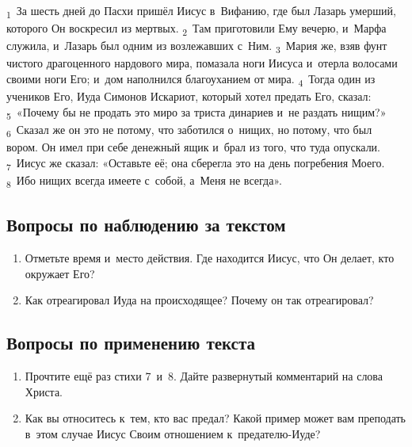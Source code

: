 \documentclass[a4paper,12pt]{article}
\begin{document}
\textsubscript{1}~За шесть дней до Пасхи пришёл Иисус в~Вифанию, где был Лазарь умерший, которого Он воскресил из мертвых. \textsubscript{2}~Там приготовили Ему вечерю, и~Марфа служила, и~Лазарь был одним из возлежавших с~Ним. \textsubscript{3}~Мария же, взяв фунт чистого драгоценного нардового мира, помазала ноги Иисуса и~отерла волосами своими ноги Его; и~дом наполнился благоуханием от мира. \textsubscript{4}~Тогда один из учеников Его, Иуда Симонов Искариот, который хотел предать Его, сказал: \textsubscript{5}~«Почему бы не продать это миро за триста динариев и~не раздать нищим?» \textsubscript{6}~Сказал же он это не потому, что заботился о~нищих, но потому, что был вором. Он имел при себе денежный ящик и~брал из того, что туда опускали. \textsubscript{7}~Иисус же сказал: «Оставьте её; она сберегла это на день погребения Моего. \textsubscript{8}~Ибо нищих всегда имеете с~собой, а~Меня не всегда».

\subsection*{Вопросы по наблюдению за текстом}
\begin{enumerate}
    \item Отметьте время и~место действия. Где находится Иисус, что Он делает, кто окружает Его? 
    
    \myline
    
    \myline
    \item Как отреагировал Иуда на происходящее? Почему он так отреагировал? 
    
    \myline
    
    \myline
\end{enumerate}

\subsection*{Вопросы по применению текста} 
\begin{enumerate}
    \item Прочтите ещё раз стихи 7~и~8. Дайте развернутый комментарий на слова Христа. 
    
    \myline
    
    \myline
    \item Как вы относитесь к~тем, кто вас предал? Какой пример может вам преподать в~этом случае Иисус Своим отношением к~предателю-Иуде? 
    
    \myline
    
    \myline
\end{enumerate}
\end{document}
